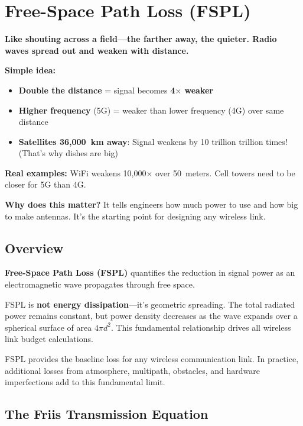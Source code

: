 \chapter{Free-Space Path Loss (FSPL)}
\label{ch:fspl}

\begin{nontechnical}
\textbf{Like shouting across a field---the farther away, the quieter. Radio waves spread out and weaken with distance.}

\textbf{Simple idea:}
\begin{itemize}
\item \textbf{Double the distance} = signal becomes \textbf{4$\times$ weaker}
\item \textbf{Higher frequency} (5G) = weaker than lower frequency (4G) over same distance
\item \textbf{Satellites 36,000~km away}: Signal weakens by 10 trillion trillion times! (That's why dishes are big)
\end{itemize}

\textbf{Real examples:} WiFi weakens 10,000$\times$ over 50~meters. Cell towers need to be closer for 5G than 4G.

\textbf{Why does this matter?} It tells engineers how much power to use and how big to make antennas. It's the starting point for designing any wireless link.
\end{nontechnical}

\section{Overview}

\textbf{Free-Space Path Loss (FSPL)} quantifies the reduction in signal power as an electromagnetic wave propagates through free space.

\begin{keyconcept}
FSPL is \textbf{not energy dissipation}---it's geometric spreading. The total radiated power remains constant, but power density decreases as the wave expands over a spherical surface of area $4\pi d^2$. This fundamental relationship drives all wireless link budget calculations.
\end{keyconcept}

FSPL provides the baseline loss for any wireless communication link. In practice, additional losses from atmosphere, multipath, obstacles, and hardware imperfections add to this fundamental limit.

\section{The Friis Transmission Equation}

